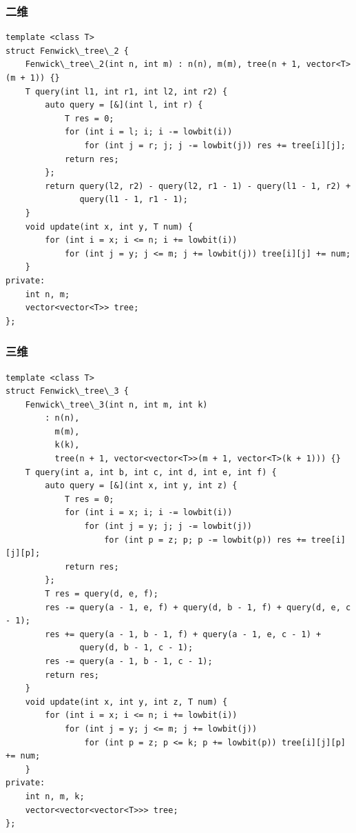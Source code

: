 \documentclass[UTF8]{ctexart}
\begin{document}
\begin{sloppypar}
\subsubsection{二维}

\begin{lstlisting}[style=cpp]
template <class T>
struct Fenwick\_tree\_2 {
    Fenwick\_tree\_2(int n, int m) : n(n), m(m), tree(n + 1, vector<T>(m + 1)) {}
    T query(int l1, int r1, int l2, int r2) {
        auto query = [&](int l, int r) {
            T res = 0;
            for (int i = l; i; i -= lowbit(i))
                for (int j = r; j; j -= lowbit(j)) res += tree[i][j];
            return res;
        };
        return query(l2, r2) - query(l2, r1 - 1) - query(l1 - 1, r2) +
               query(l1 - 1, r1 - 1);
    }
    void update(int x, int y, T num) {
        for (int i = x; i <= n; i += lowbit(i))
            for (int j = y; j <= m; j += lowbit(j)) tree[i][j] += num;
    }
private:
    int n, m;
    vector<vector<T>> tree;
};
\end{lstlisting}

\subsubsection{三维}

\begin{lstlisting}[style=cpp]
template <class T>
struct Fenwick\_tree\_3 {
    Fenwick\_tree\_3(int n, int m, int k)
        : n(n),
          m(m),
          k(k),
          tree(n + 1, vector<vector<T>>(m + 1, vector<T>(k + 1))) {}
    T query(int a, int b, int c, int d, int e, int f) {
        auto query = [&](int x, int y, int z) {
            T res = 0;
            for (int i = x; i; i -= lowbit(i))
                for (int j = y; j; j -= lowbit(j))
                    for (int p = z; p; p -= lowbit(p)) res += tree[i][j][p];
            return res;
        };
        T res = query(d, e, f);
        res -= query(a - 1, e, f) + query(d, b - 1, f) + query(d, e, c - 1);
        res += query(a - 1, b - 1, f) + query(a - 1, e, c - 1) +
               query(d, b - 1, c - 1);
        res -= query(a - 1, b - 1, c - 1);
        return res;
    }
    void update(int x, int y, int z, T num) {
        for (int i = x; i <= n; i += lowbit(i))
            for (int j = y; j <= m; j += lowbit(j))
                for (int p = z; p <= k; p += lowbit(p)) tree[i][j][p] += num;
    }
private:
    int n, m, k;
    vector<vector<vector<T>>> tree;
};
\end{lstlisting}


\end{sloppypar}
\end{document}
